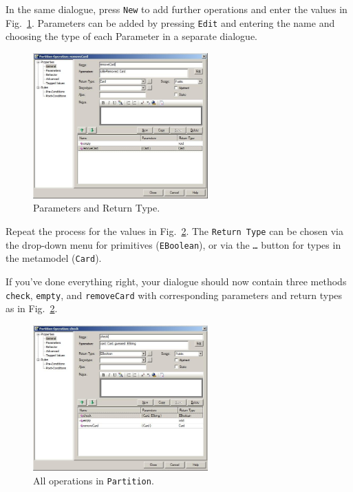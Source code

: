\clearpage

In the same dialogue, press \texttt{New} to add further operations and enter the
values in Fig.~\ref{fig:operation_parameters}.  Parameters can be added by
pressing \texttt{Edit} and entering the name and choosing the type of each
Parameter in a separate dialogue.

\begin{figure}[htbp]
	\centering
  \includegraphics[width=0.6\textwidth]{pics/memBox38.png}
	\caption{Parameters and Return Type.}
	\label{fig:operation_parameters}
\end{figure}

Repeat the process for the values in Fig.~\ref{fig:operation_partition}.  The
\texttt{Return Type} can be chosen via the drop-down menu for primitives
(\texttt{EBoolean}), or via the \texttt{\ldots} button for types in the
metamodel (\texttt{Card}). 

If you've done everything right, your dialogue should
now contain three methods \texttt{check}, \texttt{empty}, and
\texttt{removeCard} with corresponding parameters and return types as in
Fig.~\ref{fig:operation_partition}.

\begin{figure}[htbp]
	\centering
  \includegraphics[width=0.6\textwidth]{pics/memBox39.png}
	\caption{All operations in \texttt{Partition}.}
	\label{fig:operation_partition}
\end{figure}

